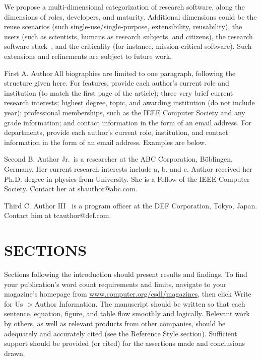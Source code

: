\documentclass{IEEEcsmag}
\begin{document}
We propose a multi-dimensional categorization of research software, along the dimensions of roles, developers, and maturity. Additional dimensions could be the reuse scenarios (such single-use/single-purpose, extensibility, reusability), the users (such as scientists, humans as research subjects, and citizens), the research software stack~\cite{Hinsen2019}, and the criticality (for instance, mission-critical software). Such extensions and refinements are subject to future work.

\vspace*{-8pt}


\def\refname{REFERENCES}
{}

\begin{IEEEbiography}{First A. Author}{\,}All biographies are limited to one paragraph, following the structure given here. For features, provide each author's current role and institution (to match the first page of the article); three very brief current research interests; highest degree, topic, and awarding institution (do not include year); professional memberships, such as the IEEE Computer Society and any grade information; and contact information in the form of an email address. For departments, provide each author's current role, institution, and contact information in the form of an email address. Examples are below. 
\end{IEEEbiography}

\begin{IEEEbiography}{Second B. Author Jr.}{\,} is a researcher at the  ABC Corporation, B\"oblingen, Germany.  Her current research interests include a, b, and c. Author received her Ph.D. degree  in physics from University. She is a Fellow of the IEEE Computer Society. Contact her at sbauthor@abc.com.\vspace*{8pt}
\end{IEEEbiography}

\begin{IEEEbiography}{Third C. Author III} {\,} is a program officer at the  DEF Corporation, Tokyo, Japan. Contact him at tcauthor@def.com.
\end{IEEEbiography}

\onecolumn
\newpage

\section{SECTIONS}


Sections following the introduction should present results and findings. To find your publication's word count requirements and limits, navigate to your magazine's homepage from \href{https://www.computer.org/csdl/magazines}{www.computer.org/csdl/magazines}, then click Write for Us $>$Author Information. The manuscript should be written so that each sentence, equation, figure, and table flow smoothly and logically. Relevant work by others, as well as relevant products from other companies, should be adequately and accurately cited (see the Reference Style section). Sufficient support should be provided (or cited) for the assertions made and conclusions drawn.
\end{document}
